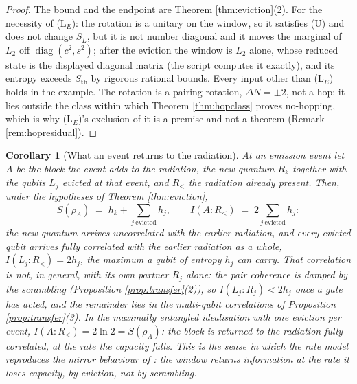 \documentclass[11pt]{article}
\newtheorem{corollary}[theorem]{Corollary}
\theoremstyle{definition}
\newcommand{\Sth}{S_{\mathrm{th}}}
\begin{document}
\begin{proof}
The bound and the endpoint are Theorem \ref{thm:eviction}(2). For the necessity of (L$_E$): the rotation is a unitary on the window, so it satisfies (U) and does not change $S_L$, but it is not number diagonal and it moves the marginal of $L_2$ off $\operatorname{diag}(c^{2}, s^{2})$; after the eviction the window is $L_2$ alone, whose reduced state is the displayed diagonal matrix (the script computes it exactly), and its entropy exceeds $\Sth$ by rigorous rational bounds. Every input other than (L$_E$) holds in the example. The rotation is a pairing rotation, $\Delta N = \pm 2$, not a hop: it lies outside the class within which Theorem \ref{thm:hopclass} proves no-hopping, which is why (L$_E$)'s exclusion of it is a premise and not a theorem (Remark \ref{rem:hopresidual}).
\end{proof}

\begin{corollary}[What an event returns to the radiation]\label{cor:mirror}
At an emission event let $A$ be the block the event adds to the radiation, the new quantum $R_k$ together with the qubits $L_j$ evicted at that event, and $R_{<}$ the radiation already present. Then, under the hypotheses of Theorem \ref{thm:eviction},
\[
S(\rho_A) \;=\; h_k + \sum_{j\ \mathrm{evicted}} h_j , \qquad I(A{:}R_{<}) \;=\; 2\sum_{j\ \mathrm{evicted}} h_j :
\]
the new quantum arrives uncorrelated with the earlier radiation, and every evicted qubit arrives fully correlated with the earlier radiation as a whole, $I(L_j{:}R_{<}) = 2h_j$, the maximum a qubit of entropy $h_j$ can carry. That correlation is not, in general, with its own partner $R_j$ alone: the pair coherence is damped by the scrambling (Proposition \ref{prop:transfer}(2)), so $I(L_j{:}R_j) < 2h_j$ once a gate has acted, and the remainder lies in the multi-qubit correlations of Proposition \ref{prop:transfer}(3). In the maximally entangled idealisation with one eviction per event, $I(A{:}R_{<}) = 2\ln 2 = S(\rho_A)$: the block is returned to the radiation fully correlated, at the rate the capacity falls. This is the sense in which the rate model reproduces the mirror behaviour of \cite{HP2007}: the window returns information at the rate it loses capacity, by eviction, not by scrambling.
\end{corollary}
\end{document}

